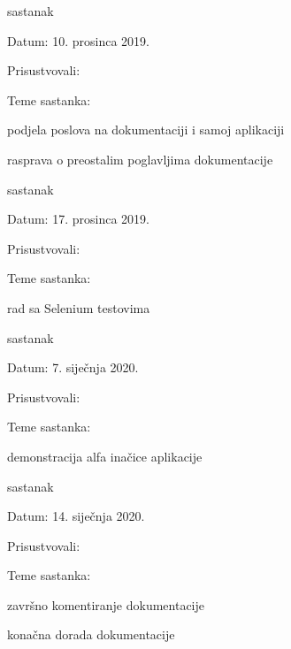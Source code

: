 \begin{packed_enum}
			\item  sastanak
			\item[] \begin{packed_item}
				\item Datum: 10. prosinca 2019.
				\item Prisustvovali: \imenaSvihClanova
				\item Teme sastanka:
				\begin{packed_item}
					\item podjela poslova na dokumentaciji i samoj aplikaciji
					\item rasprava o preostalim poglavljima dokumentacije
				\end{packed_item}
			\end{packed_item}
			
			\item  sastanak
			\item[] \begin{packed_item}
				\item Datum: 17. prosinca 2019.
				\item Prisustvovali: \imenaSvihClanova
				\item Teme sastanka:
				\begin{packed_item}
					\item rad sa Selenium testovima
				\end{packed_item}
			\end{packed_item}
			
			\item  sastanak
			\item[] \begin{packed_item}
				\item Datum: 7. siječnja 2020.
				\item Prisustvovali: \imenaSvihClanova
				\item Teme sastanka:
				\begin{packed_item}
					\item demonstracija alfa inačice aplikacije
				\end{packed_item}
			\end{packed_item}
			
			\item  sastanak
			\item[] \begin{packed_item}
				\item Datum: 14. siječnja 2020.
				\item Prisustvovali: \imenaSvihClanova
				\item Teme sastanka:
				\begin{packed_item}
					\item završno komentiranje dokumentacije
					\item konačna dorada dokumentacije
				\end{packed_item}
			\end{packed_item}
			
		\end{packed_enum}
		
